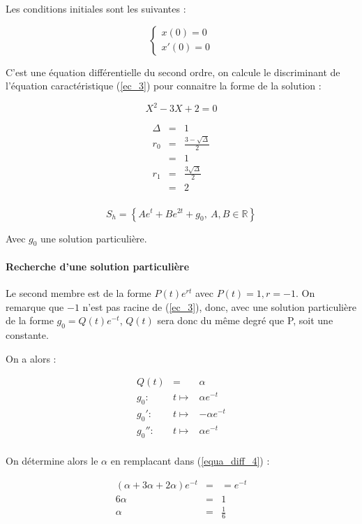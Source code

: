 \documentclass[a4paper, 11pt]{report} %
\newcommand{\R}{\mathbb{R}}
\renewcommand{\mapsto}{\longmapsto}
\begin{document}
Les conditions initiales sont les suivantes :

\[
\left\{\begin{array}{l}
x(0) = 0\\
x'(0) = 0
\end{array}\right.
\]

C'est une équation différentielle du second ordre, on calcule le discriminant de l'équation caractéristique (\ref{ec_3})
pour connaitre la forme de la solution :

\begin{equation}
X^2  -3X + 2 = 0
\label{ec_3}
\end{equation}

\begin{eqnarray*}
    \Delta & = & 1\\
    r_0 & = & \frac{3-\sqrt{\Delta}}{2}\\
    & = & 1\\
    r_1 & = & \frac{3\sqrt{\Delta}}{2}\\
    & = & 2\\
\end{eqnarray*}

\[
S_h = \left\{Ae^{t} + Be^{2t} + g_0,~A,B\in\R\right\}
\]

Avec $g_0$ une solution particulière.

\paragraph{Recherche d'une solution particulière}

Le second membre est de la forme $P(t)e^{rt}$ avec $P(t)=1, r = -1$. On remarque que $-1$ n'est pas racine de
(\ref{ec_3}), donc, avec une solution particulière de la forme $g_0=Q(t)e^{-t}$, $Q(t)$ sera donc du même degré que P,
soit une constante.

On a alors :

\begin{eqnarray*}
Q(t) & = & \alpha\\
g_0 : & t \mapsto & \alpha e^{-t}\\
g_0' : & t \mapsto & -\alpha e^{-t}\\
g_0'' : & t \mapsto & \alpha e^{-t}\\
\end{eqnarray*}

On détermine alors le $\alpha$ en remplacant dans (\ref{equa_diff_4}) :

\begin{eqnarray*}
(\alpha +3\alpha+2\alpha)e^{-t} & = &= e^{-t}\\
6\alpha & = & 1\\
\alpha & = & \frac{1}{6}
\end{eqnarray*}
\end{document}
